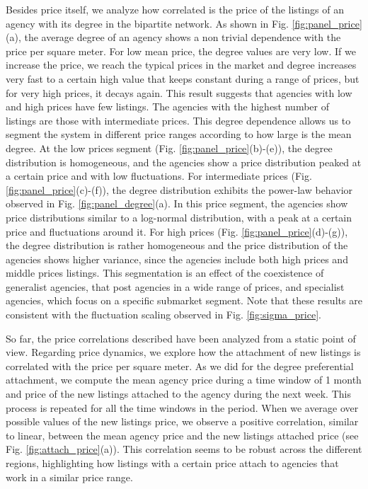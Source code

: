 Besides price itself, we analyze how correlated is the price of the listings of an agency with its degree in the bipartite network. As shown in Fig. \ref{fig:panel_price}(a), the average degree of an agency shows a non trivial dependence with the price per square meter. For low mean price, the degree values are very low. If we increase the price, we reach the typical prices in the market and degree increases very fast to a certain high value that keeps constant during a range of prices, but for very high prices, it decays again. This result suggests that agencies with low and high prices have few listings. The agencies with the highest number of listings are those with intermediate prices. This degree dependence allows us to segment the system in different price ranges according to how large is the mean degree. At the low prices segment (Fig. \ref{fig:panel_price}(b)-(e)), the degree distribution is homogeneous, and the agencies show a price distribution peaked at a certain price and with low fluctuations. For intermediate prices (Fig. \ref{fig:panel_price}(c)-(f)), the degree distribution exhibits the power-law behavior observed in Fig. \ref{fig:panel_degree}(a). In this price segment, the agencies show price distributions similar to a log-normal distribution, with a peak at a certain price and fluctuations around it. For high prices (Fig. \ref{fig:panel_price}(d)-(g)), the degree distribution is rather homogeneous and the price distribution of the agencies shows higher variance, since the agencies include both high prices and middle prices listings. This segmentation is an effect of the coexistence of generalist agencies, that post agencies in a wide range of prices, and specialist agencies, which focus on a specific submarket segment. Note that these results are consistent with the fluctuation scaling observed in Fig. \ref{fig:sigma_price}. 

So far, the price correlations described have been analyzed from a static point of view. Regarding price dynamics, we explore how the attachment of new listings is correlated with the price per square meter. As we did for the degree preferential attachment, we compute the mean agency price during a time window of 1 month and price of the new listings attached to the agency during the next week. This process is repeated for all the time windows in the period. When we average over possible values of the new listings price, we observe a positive correlation, similar to linear, between the mean agency price and the new listings attached price (see Fig. \ref{fig:attach_price}(a)). This correlation seems to be robust across the different regions, highlighting how listings with a certain price attach to agencies that work in a similar price range.

